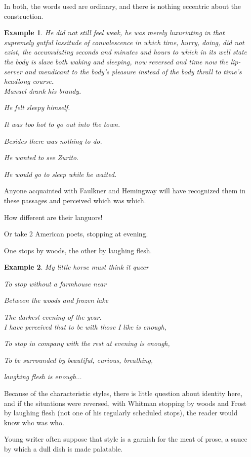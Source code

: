 \documentclass{article}
\newtheorem{example}{Example}
\begin{document}
In both, the words used are ordinary, and there is nothing eccentric about the construction.
\begin{example}
	He did not still feel weak, he was merely luxuriating in that supremely gutful lassitude of convalescence in which time, hurry, doing, did not exist, the accumulating seconds and minutes and hours to which in its well state the body is slave both waking and sleeping, now reversed and time now the lip-server and mendicant to the body's pleasure instead of the body thrall to time's headlong course.
	\\
	
	Manuel drank his brandy.
	
	He felt sleepy himself.
	
	It was too hot to go out into the town.
	
	Besides there was nothing to do.
	
	He wanted to see Zurito.
	
	He would go to sleep while he waited.
\end{example}
Anyone acquainted with Faulkner and Hemingway will have recognized them in these passages and perceived which was which.

How different are their languors!

%
Or take 2 American poets, stopping at evening.

One stops by woods, the other by laughing flesh.
\begin{example}
	My little horse must think it queer
	
	To stop without a farmhouse near
	
	Between the woods and frozen lake
	
	The darkest evening of the year.
	\\
	
	I have perceived that to be with those I like is enough,
	
	To stop in company with the rest at evening is enough,
	
	To be surrounded by beautiful, curious, breathing,
	
	laughing flesh is enough$\ldots$
\end{example}
Because of the characteristic styles, there is little question about identity here, and if the situations were reversed, with Whitman stopping by woods and Frost by laughing flesh (not one of his regularly scheduled stops), the reader would know who was who.

%
Young writer often suppose that style is a garnish for the meat of prose, a sauce by which a dull dish is made palatable.
\end{document}
